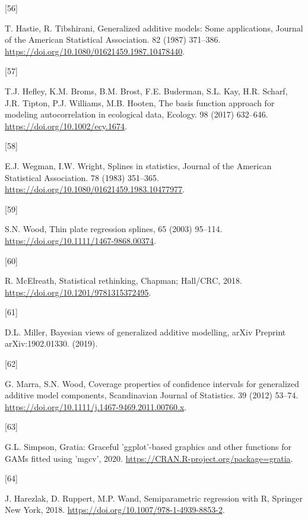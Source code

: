 \documentclass[
]{article}
\newlength{\cslhangindent}
\newlength{\csllabelwidth}
\newlength{\cslentryspacingunit} %
\newenvironment{CSLReferences}[2] %
 {%
  \setlength{\parindent}{0pt}
  \ifodd #1
  \let\oldpar\par
  \def\par{\hangindent=\cslhangindent\oldpar}
  \fi
  \setlength{\parskip}{#2\cslentryspacingunit}
 }%
 {}
\newcommand{\CSLLeftMargin}[1]{\parbox[t]{\csllabelwidth}{#1}}
\newcommand{\CSLRightInline}[1]{\parbox[t]{\linewidth - \csllabelwidth}{#1}\break}
\begin{document}
\begin{CSLReferences}{0}{0}
\leavevmode{}%
\CSLLeftMargin{{[}56{]} }
\CSLRightInline{T. Hastie, R. Tibshirani, Generalized additive models: Some applications, Journal of the American Statistical Association. 82 (1987) 371--386. \url{https://doi.org/10.1080/01621459.1987.10478440}.}

\leavevmode{}%
\CSLLeftMargin{{[}57{]} }
\CSLRightInline{T.J. Hefley, K.M. Broms, B.M. Brost, F.E. Buderman, S.L. Kay, H.R. Scharf, J.R. Tipton, P.J. Williams, M.B. Hooten, The basis function approach for modeling autocorrelation in ecological data, Ecology. 98 (2017) 632--646. \url{https://doi.org/10.1002/ecy.1674}.}

\leavevmode{}%
\CSLLeftMargin{{[}58{]} }
\CSLRightInline{E.J. Wegman, I.W. Wright, Splines in statistics, Journal of the American Statistical Association. 78 (1983) 351--365. \url{https://doi.org/10.1080/01621459.1983.10477977}.}

\leavevmode{}%
\CSLLeftMargin{{[}59{]} }
\CSLRightInline{S.N. Wood, Thin plate regression splines, 65 (2003) 95--114. \url{https://doi.org/10.1111/1467-9868.00374}.}

\leavevmode{}%
\CSLLeftMargin{{[}60{]} }
\CSLRightInline{R. McElreath, Statistical rethinking, Chapman; Hall/{CRC}, 2018. \url{https://doi.org/10.1201/9781315372495}.}

\leavevmode{}%
\CSLLeftMargin{{[}61{]} }
\CSLRightInline{D.L. Miller, Bayesian views of generalized additive modelling, arXiv Preprint arXiv:1902.01330. (2019).}

\leavevmode{}%
\CSLLeftMargin{{[}62{]} }
\CSLRightInline{G. Marra, S.N. Wood, Coverage properties of confidence intervals for generalized additive model components, Scandinavian Journal of Statistics. 39 (2012) 53--74. \url{https://doi.org/10.1111/j.1467-9469.2011.00760.x}.}

\leavevmode{}%
\CSLLeftMargin{{[}63{]} }
\CSLRightInline{G.L. Simpson, Gratia: Graceful 'ggplot'-based graphics and other functions for GAMs fitted using 'mgcv', 2020. \url{https://CRAN.R-project.org/package=gratia}.}

\leavevmode{}%
\CSLLeftMargin{{[}64{]} }
\CSLRightInline{J. Harezlak, D. Ruppert, M.P. Wand, Semiparametric regression with {R}, Springer New York, 2018. \url{https://doi.org/10.1007/978-1-4939-8853-2}.}


\end{CSLReferences}
\end{document}
